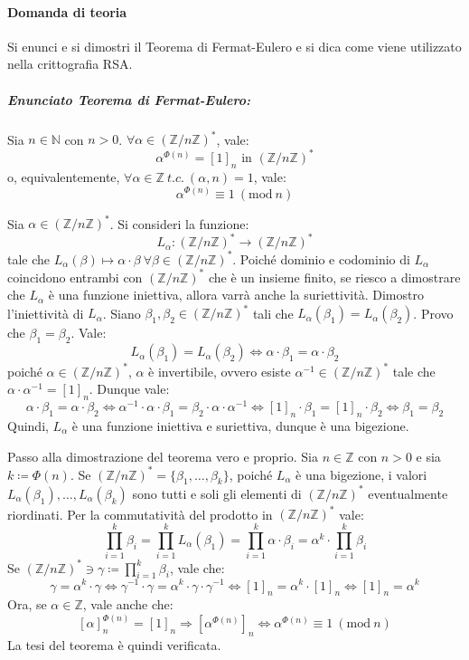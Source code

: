 \documentclass[12pt, a4paper]{report}
\theoremstyle{definition}
\newcommand{\Mod}[1]{\ (\mathrm{mod}\ #1)}
\newcommand{\inv}{(\mathbb{Z}/n\mathbb{Z})^*}
\begin{document}
\paragraph{Domanda di teoria}
Si enunci e si dimostri il Teorema di Fermat-Eulero e si dica come viene
utilizzato nella crittografia RSA.
\subparagraph{Enunciato Teorema di Fermat-Eulero:}
Sia $n\in\mathbb{N}$ con $n>0$. $\forall\alpha\in\inv$, vale:
\[\alpha^{\Phi(n)}=[1]_n\text{ in }\inv\]
o, equivalentemente, $\forall\alpha\in\mathbb{Z}\ t.c.\ (\alpha,n)=1$, vale:
\[\alpha^{\Phi(n)}\equiv1\Mod{n}\]
\begin{demonstration}
    Sia $\alpha\in\inv$. Si consideri la funzione:
    \[L_\alpha:\inv\to\inv\]
    tale che $L_\alpha(\beta)\mapsto\alpha\cdot\beta\ \forall\beta\in\inv$.
    Poiché dominio e codominio di $L_\alpha$ coincidono entrambi con $\inv$ che
    è un insieme finito, se riesco a dimostrare che $L_\alpha$ è una funzione
    iniettiva, allora varrà anche la suriettività. Dimostro l'iniettività di
    $L_\alpha$. Siano $\beta_1,\beta_2\in\inv$ tali che $L_\alpha(\beta_1)=L
    _\alpha(\beta_2)$. Provo che $\beta_1=\beta_2$. Vale:
    \[L_\alpha(\beta_1)=L_\alpha(\beta_2)\Leftrightarrow\alpha\cdot\beta_1=
    \alpha\cdot\beta_2\]
    poiché $\alpha\in\inv$, $\alpha$ è invertibile, ovvero esiste $\alpha^{-1}\in
    \inv$ tale che $\alpha\cdot\alpha^{-1}=[1]_n$. Dunque vale:
    \[\alpha\cdot\beta_1=\alpha\cdot\beta_2\Leftrightarrow\alpha^{-1}\cdot\alpha
    \cdot\beta_1=\beta_2\cdot\alpha\cdot\alpha^{-1}\Leftrightarrow[1]_n\cdot
    \beta_1=[1]_n\cdot\beta_2\Leftrightarrow\beta_1=\beta_2\]
    Quindi, $L_\alpha$ è una funzione iniettiva e suriettiva, dunque è una
    bigezione.

    Passo alla dimostrazione del teorema vero e proprio. Sia $n\in\mathbb{Z}$ con
    $n>0$ e sia $k\coloneqq\Phi(n)$. Se $\inv=\{\beta_1,\dots,\beta_k\}$, poiché
    $L_\alpha$ è una bigezione, i valori $L_\alpha(\beta_1),\dots,L_\alpha(\beta_k)$
    sono tutti e soli gli elementi di $\inv$ eventualmente riordinati. Per la
    commutatività del prodotto in $\inv$ vale:
    \[\prod_{i=1}^k\beta_i=\prod_{i=1}^kL_\alpha(\beta_1)=\prod_{i=1}^k\alpha
    \cdot\beta_i=\alpha^k\cdot\prod_{i=1}^k\beta_i\]
    Se $\inv\ni\gamma\coloneqq\prod_{i=1}^k\beta_i$, vale che:
    \[\gamma=\alpha^k\cdot\gamma\Leftrightarrow\gamma^{-1}\cdot\gamma=\alpha^k\cdot
    \gamma\cdot\gamma^{-1}\Leftrightarrow[1]_n=\alpha^k\cdot[1]_n\Leftrightarrow
    [1]_n=\alpha^k\]
    Ora, se $\alpha\in\mathbb{Z}$, vale anche che:
    \[[\alpha]^{\Phi(n)}_n=[1]_n\Rightarrow[\alpha^{\Phi(n)}]_n\Leftrightarrow
    \alpha^{\Phi(n)}\equiv1\Mod{n}\]
    La tesi del teorema è quindi verificata.
\end{demonstration}
\end{document}
